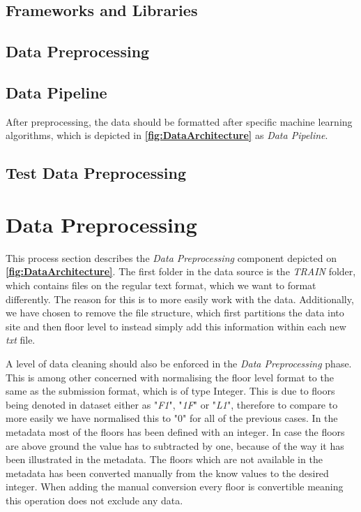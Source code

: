 \subsection{Frameworks and Libraries}

\subsection{Data Preprocessing}


\subsection{Data Pipeline} \label{sec:datapipeline}
After preprocessing, the data should be formatted after specific machine learning algorithms, which is depicted in \textbf{\autoref{fig:DataArchitecture}} as \textit{Data Pipeline}.

\subsection{Test Data Preprocessing}


\section{Data Preprocessing}
This process section describes the \textit{Data Preprocessing} component depicted on \textbf{\autoref{fig:DataArchitecture}}. The first folder in the data source is the \textit{TRAIN} folder, which contains files on the regular text format, which we want to format differently. The reason for this is to more easily work with the data. Additionally, we have chosen to remove the file structure, which first partitions the data into site and then floor level to instead simply add this information within each new \textit{txt} file.

A level of data cleaning should also be enforced in the \textit{Data Preprocessing} phase. This is among other concerned with normalising the floor level format to the same as the submission format, which is of type Integer. This is due to floors being denoted in dataset either as "\textit{F1}", "\textit{1F}" or "\textit{L1}", therefore to compare to more easily we have normalised this to "0" for all of the previous cases. In the metadata most of the floors has been defined with an integer. In case the floors are above ground the value has to subtracted by one, because of the way it has been illustrated in the metadata. The floors which are not available in the metadata has been converted manually from the know values to the desired integer. When adding the manual conversion every floor is convertible meaning this operation does not exclude any data.

